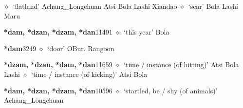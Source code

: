 \begin{list}{}{\leftmargin=1.5em \itemindent=-1.5em}
\hspace{1ex}
         $\diamond$~`flatland'
         Achang\_Longchuan 
\hspace{1ex}
         Atsi 
\hspace{1ex}
         Bola 
\hspace{1ex}
         Lashi 
\hspace{1ex}
         Xiandao 
\hspace{1ex}
         $\diamond$~`scar'
         Bola 
\hspace{1ex}
         Lashi 
\hspace{1ex}
         Maru 
  \item {\footnotesize \textbf{*dam, *dzan, *dzam, *dan}}{\tiny 11491}
\hspace{1ex}
         $\diamond$~`this year'
         Bola 
  \item {\footnotesize \textbf{*dam}}{\tiny 3249}
\hspace{1ex}
         $\diamond$~`door'
         OBur. 
\hspace{1ex}
         Rangoon 
  \item {\footnotesize \textbf{*dzam, *dzan, *dam, *dan}}{\tiny 11659}
\hspace{1ex}
         $\diamond$~`time / instance (of hitting)'
         Atsi 
\hspace{1ex}
         Bola 
\hspace{1ex}
         Lashi 
\hspace{1ex}
         $\diamond$~`time / instance (of kicking)'
         Atsi 
\hspace{1ex}
         Bola 
  \item {\footnotesize \textbf{*dam, *dzan, *dzam, *dan}}{\tiny 10596}
\hspace{1ex}
         $\diamond$~`startled, be / shy (of animals)'
         Achang\_Longchuan 
\hspace{1ex}

\end{list}
